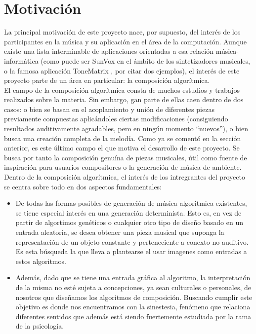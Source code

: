 \section{Motivación}


La principal motivación de este proyecto nace, por supuesto, del interés de los participantes en la música y su aplicación en el área de la computación. Aunque existe una lista interminable de aplicaciones orientadas a esa relación música-informática (como puede ser SunVox \cite{SunVox} en el ámbito de los sintetizadores musicales, o la famosa aplicación ToneMatrix \cite{toneMatrix}, por citar dos ejemplos), el interés de este proyecto parte de un área en particular: la composición algorítmica.\\

El campo de la composición algorítmica consta de muchos estudios y trabajos realizados sobre la materia. Sin embargo, gan parte de ellas caen dentro de dos casos: o bien se basan en el acoplamiento y unión de diferentes piezas previamente compuestas aplicándoles ciertas modificaciones (consiguiendo resultados auditivamente agradables, pero en ningún momento ``nuevos''), o bien busca una creación completa de la melodía. Como ya se comentó en la sección anterior, es este último campo el que motiva el desarrollo de este proyecto. Se busca por tanto la composición genuína de piezas musicales, útil como fuente de inspiración para usuarios compositores o la generación de música de ambiente.\\

Dentro de la composición algorítmica, el interés de los intregrantes del proyecto se centra sobre todo en dos aspectos fundamentales:

\begin{itemize}

	\item De todas las formas posibles de generación de música algoritmica existentes, se tiene especial interés en una generación determinista. Esto es, en vez de partir de algortimos genéticos o cualquier otro tipo de diseño basado en un entrada aleatoria, se desea obtener una pieza musical que suponga la representación de un objeto constante y perteneciente a conexto no auditivo. Es esta búsqueda la que lleva a plantearse el usar imagenes como entradas a estos algoritmos.
	
	\item Además, dado que se tiene una entrada gráfica al algoritmo, la interpretación de la misma no esté sujeta a concepciones, ya sean culturales o personales, de nosotros que diseñamos los algoritmos de composición. Buscando cumplir este objetivo es donde nos encuentramos con la sinestesia, fenómeno que relaciona diferentes sentidos que además está siendo fuertemente estudiada por la rama de la psicología.
	
\end{itemize}

